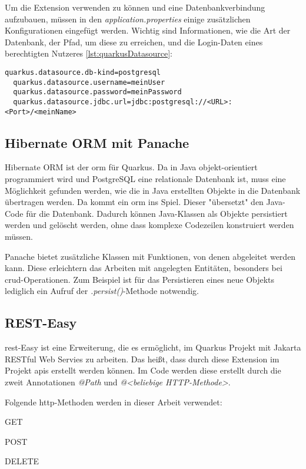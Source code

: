 Um die Extension verwenden zu können und eine Datenbankverbindung aufzubauen, müssen in den \emph{application.properties} einige zusätzlichen Konfigurationen eingefügt werden. 
Wichtig sind Informationen, wie die Art der Datenbank, der Pfad, um diese zu erreichen, und die Login-Daten eines berechtigten Nutzeres \ref{lst:quarkusDatasource}:

\begin{lstlisting}[caption=Beispielkonfigurationen,label=lst:quarkusDatasource]
  quarkus.datasource.db-kind=postgresql 
  quarkus.datasource.username=meinUser
  quarkus.datasource.password=meinPassword
  quarkus.datasource.jdbc.url=jdbc:postgresql://<URL>:<Port>/<meinName>
\end{lstlisting}

\subsection{Hibernate ORM mit Panache}
Hibernate ORM ist der \gls{orm} für Quarkus. 
Da in Java objekt-orientiert programmiert wird und PostgreSQL eine relationale Datenbank ist, muss eine Möglichkeit gefunden werden, wie die in Java erstellten Objekte in die Datenbank übertragen werden. 
Da kommt ein \gls{orm} ins Spiel. 
Dieser "übersetzt" den Java-Code für die Datenbank. 
Dadurch können Java-Klassen als Objekte persistiert werden und gelöscht werden, ohne dass komplexe Codezeilen konstruiert werden müssen. 
\cite{ORMAbout}

Panache bietet zusätzliche Klassen mit Funktionen, von denen abgeleitet werden kann. 
Diese erleichtern das Arbeiten mit angelegten Entitäten, besonders bei \gls{crud}-Operationen.
Zum Beispiel ist für das Persistieren eines neue Objekts lediglich ein Aufruf der \emph{.persist()}-Methode notwendig.
\cite{HibernateORMwithPanache}

\subsection{REST-Easy}
\gls{rest}-Easy ist eine Erweiterung, die es ermöglicht, im Quarkus Projekt mit Jakarta RESTful Web Servies zu arbeiten. 
Das heißt, dass durch diese Extension im Projekt \gls{api}s erstellt werden können. 
Im Code werden diese erstellt durch die zweit Annotationen \emph{@Path} und \emph{@<beliebige HTTP-Methode>}.

Folgende \gls{http}-Methoden werden in dieser Arbeit verwendet:
\begin{compactitem}
    \item GET
    \item POST 
    \item DELETE
\end{compactitem}

